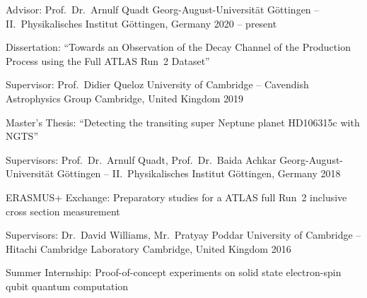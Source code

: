 

\begin{cventries}

  \cventry
    {Advisor: Prof.\ Dr.\ Arnulf Quadt} %
    {Georg-August-Universit\"at G\"ottingen -- II.\ Physikalisches Institut} %
    {G\"ottingen, Germany} %
    {2020 -- present} %
    {%
      \begin{cvitems} %
        \item {%
          Dissertation: ``Towards an Observation of the \Hbb Decay Channel of the \ttH Production Process\newline
          using the Full ATLAS Run~2 Dataset''
        }
      \end{cvitems}
    }

  \cventry
    {Supervisor: Prof.\ Didier Queloz} %
    {University of Cambridge -- Cavendish Astrophysics Group} %
    {Cambridge, United Kingdom} %
    {2019} %
    {%
      \begin{cvitems} %
        \item {Master's Thesis: ``Detecting the transiting super Neptune planet HD106315c with NGTS''}
      \end{cvitems}
    }

  \cventry
    {Supervisors: Prof.\ Dr.\ Arnulf Quadt, Prof.\ Dr.\ Baida Achkar} %
    {Georg-August-Universit\"at G\"ottingen -- II.\ Physikalisches Institut} %
    {G\"ottingen, Germany} %
    {2018} %
    {%
      \begin{cvitems} %
        \item {ERASMUS+ Exchange: Preparatory studies for a ATLAS full Run~2 \ttbar inclusive cross section measurement}
      \end{cvitems}
    }

  \cventry
    {Supervisors: Dr.\ David Williams, Mr.\ Pratyay Poddar} %
    {University of Cambridge -- Hitachi Cambridge Laboratory} %
    {Cambridge, United Kingdom} %
    {2016} %
    {%
      \begin{cvitems} %
        \item {Summer Internship: Proof-of-concept experiments on solid state electron-spin qubit quantum computation}
      \end{cvitems}
    }

\end{cventries}
